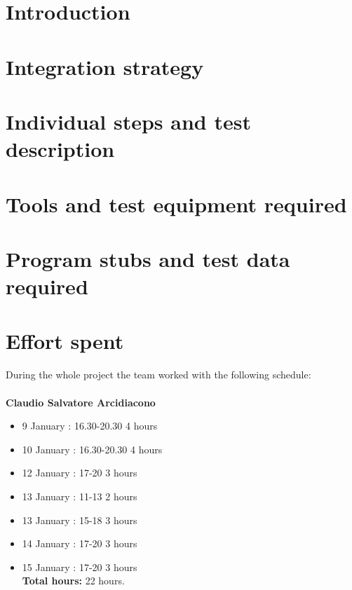 \documentclass[a4paper]{article}
\begin{document}
\newpage
{}

\tableofcontents

\newpage
\section{Introduction} 


\newpage
\section{Integration strategy}


\newpage
\section{Individual steps and test description}


\newpage
\section{Tools and test equipment required}


\newpage
\section{Program stubs and test data required}


\newpage
\section{Effort spent}
During the whole project the team worked with the following schedule:\\ \emph{\\}
\textbf{Claudio Salvatore Arcidiacono}
\begin{itemize}
\item 9 January  : 16.30-20.30 4 hours
\item 10 January : 16.30-20.30 4 hours
\item 12 January : 17-20 3 hours
\item 13 January : 11-13 2 hours
\item 13 January : 15-18 3 hours 
\item 14 January : 17-20 3 hours
\item 15 January : 17-20 3 hours\\

\textbf{Total hours:} 22 hours.
\end{itemize}
\end{document}
